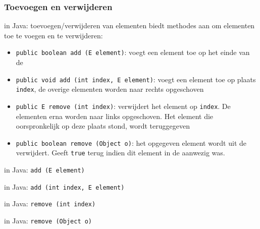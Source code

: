 \subsubsection{Toevoegen en verwijderen}
\begin{frame}[fragile]{\dsarraylist{} in Java: toevoegen/verwijderen van elementen}
\dsarraylist{} biedt methodes aan om elementen toe te voegen en te verwijderen:
\small{\begin{itemize}
 \item \texttt{public boolean add (E element)}: voegt een element toe op het einde van de \dsarraylist{}
 \item \texttt{public void add (int index, E element)}: voegt een element toe op plaats \texttt{index}, de overige elementen worden naar rechts opgeschoven
 \item \texttt{public E remove (int index)}: verwijdert het element op \texttt{index}. De elementen erna worden naar links opgeschoven. Het element die oorspronkelijk op deze plaats stond, wordt teruggegeven
 \item \texttt{public boolean remove (Object o)}: het opgegeven element wordt uit de \dsarraylist{} verwijdert. Geeft \texttt{true} terug indien dit element in de \dsarraylist{} aanwezig was.
\end{itemize}}
\end{frame}
\begin{frame}[fragile]{\dsarraylist{} in Java: \texttt{add (E element)}}
\begin{methodexample}

\end{methodexample}
\end{frame}
\begin{frame}[fragile]{\dsarraylist{} in Java: \texttt{add (int index, E element)}}
\begin{methodexample}

\end{methodexample}
\end{frame}
\begin{frame}[fragile]{\dsarraylist{} in Java: \texttt{remove (int index)}}
\begin{methodexample}

\end{methodexample}
\end{frame}
\begin{frame}[fragile]{\dsarraylist{} in Java: \texttt{remove (Object o)}}
\begin{methodexample}

\end{methodexample}
\end{frame}
